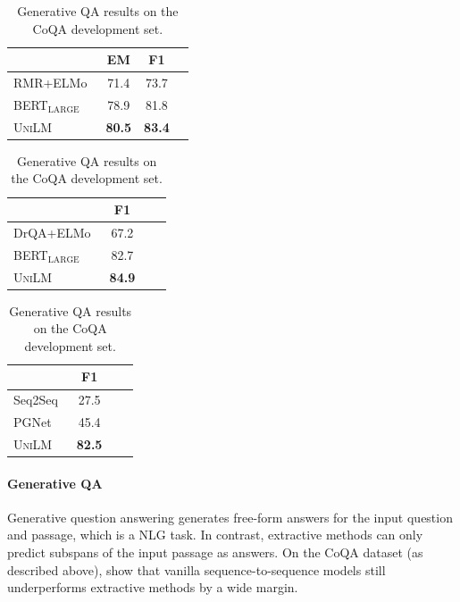 \documentclass{article}
\newcommand\ours{\textsc{UniLM}}
\begin{document}
\begin{table}[t]
\centering
\small
\begin{minipage}{1.9in}
\centering
\begin{tabular}{l c c c}
\toprule
                & EM       & F1  
                \\ \midrule
RMR+ELMo~\citep{hu-mrc-2018} & 71.4 & 73.7 \\
BERT$_{\text{LARGE}}$ & 78.9           & 81.8  \\
\ours   & \textbf{80.5} & \textbf{83.4}  \\
\bottomrule
\end{tabular}
\caption{Extractive QA results on the SQuAD development set.}
\normalsize
\label{tbl:squad:result}
\end{minipage}
\hfill
\begin{minipage}{1.7in}
\centering
\begin{tabular}{l c c c}
\toprule
                & F1    
                \\ \midrule
DrQA+ELMo~\citep{coqa} & 67.2           \\
BERT$_\text{LARGE}$ & 82.7           \\
\ours   & \textbf{84.9}  \\ \bottomrule
\end{tabular}
\caption{Extractive QA results on the CoQA development set.}
\normalsize
\label{tbl:coqa:extractive:result}
\end{minipage}
\hfill
\begin{minipage}{1.7in}
\centering
\begin{tabular}{l c c c}
\toprule
                & F1    
                \\ \midrule
Seq2Seq~\citep{coqa}   & 27.5      \\
PGNet~\citep{coqa}   & 45.4      \\
\ours & \textbf{82.5}  \\
\bottomrule
\end{tabular}
\caption{Generative QA results on the CoQA development set.}
\normalsize
\label{tbl:coqa:generative:result}
\end{minipage}
\end{table}

\paragraph{Generative QA}

Generative question answering generates free-form answers for the input question and passage, which is a NLG task.
In contrast, extractive methods can only predict subspans of the input passage as answers.
On the CoQA dataset (as described above),  show that vanilla sequence-to-sequence models still underperforms extractive methods by a wide margin.
\end{document}
